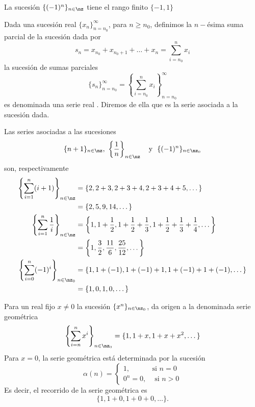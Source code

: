 \begin{example}
La sucesi\'{o}n $\{(-1)^{n}\}_{n\in\nz}$ tiene el rango finito $\{-1,1\}$
\end{example}

Dada una sucesi\'{o}n real $\{x_{n}\}_{n=n_{0}}^{\infty}$, para $n\geq n_{0}$,
definimos la $n-$\'{e}sima suma parcial
%
de la sucesi\'{o}n dada por
\begin{equation}
s_{n}=x_{n_{0}}+x_{n_{0}+1}+\dots+x_{n}=\sum_{i=n_{0}}^{n}x_{i}
\label{sumaparcial}%
\end{equation}
la sucesi\'{o}n de sumas parciales
\begin{equation}
\{s_{n}\}_{n=n_{0}}^{\infty}=\left\{  \sum_{i=n_{0}}^{n}x_{i}\right\}
_{n=n_{0}}^{\infty} \label{serie}%
\end{equation}
es denominada una serie real%
%
. Diremos de ella que es la serie asociada a la sucesi\'{o}n dada.

\begin{example}
Las series asociadas a las sucesiones
\[
\{n+1\}_{n\in\nz},\ \left\{  \frac{1}{n}\right\}  _{n\in\nz}%
\ \mbox{ \ y \ }\{(-1)^{n}\}_{n\in\nz_{0}}%
\]
son, respectivamente
\begin{align*}
\left\{  \sum_{i=1}^{n}(i+1)\right\}  _{n\in\nz}  &
=\{2,2+3,2+3+4,2+3+4+5,\dots\}\\
&  =\{2,5,9,14,\dots\}\\
\left\{  \sum_{i=1}^{n}\frac{1}{i}\right\}  _{n\in\nz}  &  =\left\{
1,1+\frac{1}{2},1+\frac{1}{2}+\frac{1}{3},1+\frac{1}{2}+\frac{1}{3}+\frac
{1}{4},\dots\right\} \\
&  =\left\{  1,\frac{3}{2},\frac{11}{6},\frac{25}{12},\dots\right\} \\
\left\{  \sum_{i=0}^{n}(-1)^{i}\right\}  _{n\in\nz_{0}}  &
=\{1,1+(-1),1+(-1)+1,1+(-1)+1+(-1),\dots\}\\
&  =\{1,0,1,0,\dots\}
\end{align*}

\end{example}

\begin{example}
Para un real fijo $x\neq0$ la sucesi\'{o}n $\{x^{n}\}_{n\in\nz_{0}}$, da
origen a la denominada serie geom\'{e}trica
\begin{equation}
\left\{  \sum_{i=n}^{n}x^{i}\right\}  _{n\in\nz_{0}}=\{1,1+x,1+x+x^{2},\dots\}
\end{equation}
Para $x=0$, la serie geom\'{e}trica est\'{a} determinada por la sucesi\'{o}n
\[
\alpha(n)=%
\begin{cases}
1, & \text{si $n=0$}\\
0^{n}=0, & \text{ si $n>0$}%
\end{cases}
\]
Es decir, el recorrido de la serie geom\'{e}trica es
\[
\{1,1+0,1+0+0,\dots\}.
\]

\end{example}

